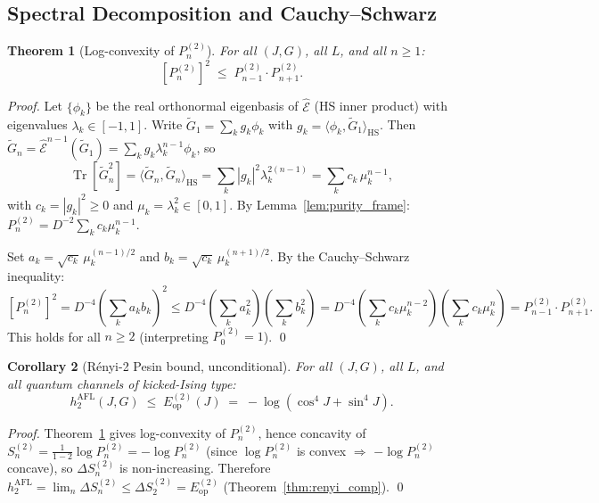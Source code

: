 \documentclass[12pt,a4paper]{article}
\newtheorem{theorem}{Theorem}[section]
\newtheorem{corollary}[theorem]{Corollary}
\begin{document}
\subsection{Spectral Decomposition and Cauchy--Schwarz}
\label{sec:spectral_cs}

\begin{theorem}[Log-convexity of $P_n^{(2)}$]
\label{thm:logconv2}
For all $(J,G)$, all $L$, and all $n\geq 1$:
\[
  \left[P_n^{(2)}\right]^2 \;\leq\; P_{n-1}^{(2)}\cdot P_{n+1}^{(2)}.
\]
\end{theorem}

\begin{proof}
Let $\{\phi_k\}$ be the real orthonormal eigenbasis of $\hat{\mathcal{E}}$ (HS inner product)
with eigenvalues $\lambda_k\in[-1,1]$.
Write $\widetilde{G}_1=\sum_k g_k\phi_k$ with $g_k=\langle\phi_k,\widetilde{G}_1\rangle_{\mathrm{HS}}$.
Then $\widetilde{G}_n=\hat{\mathcal{E}}^{n-1}(\widetilde{G}_1)=\sum_k g_k\lambda_k^{n-1}\phi_k$, so
\begin{equation}
  \label{eq:Gn2_spectral}
  \operatorname{Tr}[\widetilde{G}_n^2]
  =\langle\widetilde{G}_n,\widetilde{G}_n\rangle_{\mathrm{HS}}
  =\sum_k|g_k|^2\lambda_k^{2(n-1)}
  =\sum_k c_k\,\mu_k^{n-1},
\end{equation}
with $c_k=|g_k|^2\geq 0$ and $\mu_k=\lambda_k^2\in[0,1]$.
By Lemma~\ref{lem:purity_frame}: $P_n^{(2)}=D^{-2}\sum_k c_k\mu_k^{n-1}$.

Set $a_k=\sqrt{c_k}\,\mu_k^{(n-1)/2}$ and $b_k=\sqrt{c_k}\,\mu_k^{(n+1)/2}$.
By the Cauchy--Schwarz inequality:
\[
  \!\left[P_n^{(2)}\right]^2
  =D^{-4}\!\left(\sum_k a_k b_k\right)^{\!2}
  \leq D^{-4}\!\left(\sum_k a_k^2\right)\!\left(\sum_k b_k^2\right)
  = D^{-4}\!\left(\sum_k c_k\mu_k^{n-2}\right)\!\!\left(\sum_k c_k\mu_k^n\right)
  = P_{n-1}^{(2)}\cdot P_{n+1}^{(2)}.
\]
This holds for all $n\geq 2$ (interpreting $P_0^{(2)}=1$). \qed
\end{proof}

\begin{corollary}[Rényi-2 Pesin bound, unconditional]
\label{cor:renyi2_unconditional}
For all $(J,G)$, all $L$, and all quantum channels of kicked-Ising type:
\[
  h_2^{\mathrm{AFL}}(J,G) \;\leq\; E_{\mathrm{op}}^{(2)}(J)
  \;=\; -\log(\cos^4 J+\sin^4 J).
\]
\end{corollary}

\begin{proof}
Theorem~\ref{thm:logconv2} gives log-convexity of $P_n^{(2)}$, hence concavity
of $S_n^{(2)}=\frac{1}{1-2}\log P_n^{(2)}=-\log P_n^{(2)}$ (since $\log P_n^{(2)}$ is
convex $\Rightarrow$ $-\log P_n^{(2)}$ concave), so $\Delta S_n^{(2)}$ is non-increasing.
Therefore $h_2^{\mathrm{AFL}}=\lim_n\Delta S_n^{(2)}\leq\Delta S_2^{(2)}=E_{\mathrm{op}}^{(2)}$
(Theorem~\ref{thm:renyi_comp}). \qed
\end{proof}
\end{document}
